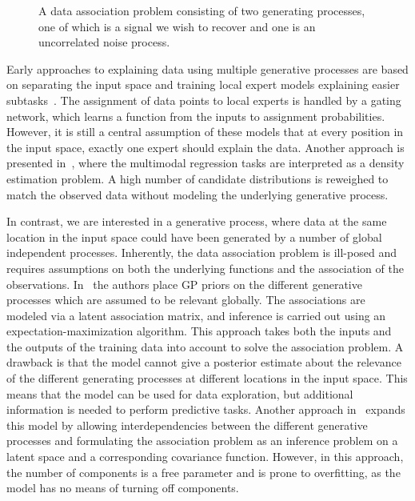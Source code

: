 \begin{figure}[t]
    \centering
    
    \caption[A data association problem]{
        \label{fig:data_association:choicenet_data}
        A data association problem consisting of two generating processes, one of which is a signal we wish to recover and one is an uncorrelated noise process.
    }
\end{figure}
Early approaches to explaining data using multiple generative processes are based on separating the input space and training local expert models explaining easier subtasks~\parencite{jacobs_adaptive_1991,tresp_mixtures_2001, rasmussen_infinite_2002}.
The assignment of data points to local experts is handled by a gating network, which learns a function from the inputs to assignment probabilities.
However, it is still a central assumption of these models that at every position in the input space, exactly one expert should explain the data.
Another approach is presented in~\parencite{bishop_mixture_1994}, where the multimodal regression tasks are interpreted as a density estimation problem.
A high number of candidate distributions is reweighed to match the observed data without modeling the underlying generative process.

In contrast, we are interested in a generative process, where data at the same location in the input space could have been generated by a number of global independent processes.
Inherently, the data association problem is ill-posed and requires assumptions on both the underlying functions and the association of the observations.
In~\parencite{lazaro-gredilla_overlapping_2012} the authors place GP priors on the different generative processes which are assumed to be relevant globally.
The associations are modeled via a latent association matrix, and inference is carried out using an expectation-maximization algorithm.
This approach takes both the inputs and the outputs of the training data into account to solve the association problem.
A drawback is that the model cannot give a posterior estimate about the relevance of the different generating processes at different locations in the input space.
This means that the model can be used for data exploration, but additional information is needed to perform predictive tasks.
Another approach in~\parencite{bodin_latent_2017} expands this model by allowing interdependencies between the different generative processes and formulating the association problem as an inference problem on a latent space and a corresponding covariance function.
However, in this approach, the number of components is a free parameter and is prone to overfitting, as the model has no means of turning off components.

